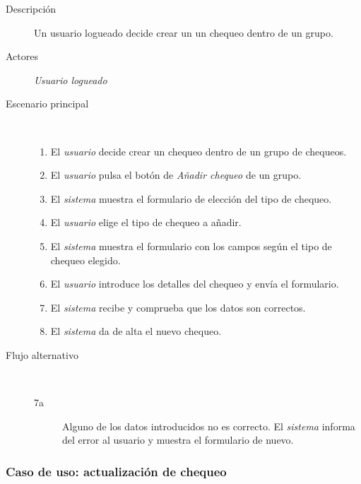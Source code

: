 \begin{description}
\item[Descripción] Un usuario logueado decide crear un un chequeo dentro de un grupo.
\item[Actores] \textit{Usuario logueado}
\item[Escenario principal] $\quad$
  \begin{enumerate}
  \item El \textit{usuario} decide crear un chequeo dentro de un grupo de chequeos.
  \item El \textit{usuario} pulsa el botón de \textit{Añadir chequeo} de un grupo.
  \item El \textit{sistema} muestra el formulario de elección del tipo de chequeo.
  \item El \textit{usuario} elige el tipo de chequeo a añadir.
  \item El \textit{sistema} muestra el formulario con los campos según el tipo de chequeo elegido.
  \item El \textit{usuario} introduce los detalles del chequeo y envía el formulario.
  \item El \textit{sistema} recibe y comprueba que los datos son correctos.
  \item El \textit{sistema} da de alta el nuevo chequeo.
  \end{enumerate}
\item[Flujo alternativo] $\quad$
  \begin{description}
  \item[7a] Alguno de los datos introducidos no es correcto. El \textit{sistema}
    informa del error al usuario y muestra el formulario de nuevo.
  \end{description}
\end{description}


\subsubsection{Caso de uso: actualización de chequeo}

